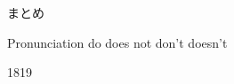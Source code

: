 \documentclass[aspectratio=169,dvipsnames]{beamer}
\newcommand{\myaudio}[1]{\href{#1}{\faVolumeUp}}
\begin{document}
\begin{frame}[plain]{まとめ}
\begin{block}{Pronunciation}
 do \hspace{15pt}does \hspace{15pt}not \hspace{15pt}don't \hspace{15pt}doesn't 
\end{block}
\vspace{-8pt}
\hfill{\tiny 1819}\,{\scriptsize \myaudio{./audio/overview/011_answer_do_audio_overview.mp4}}

\end{frame}
\end{document}
